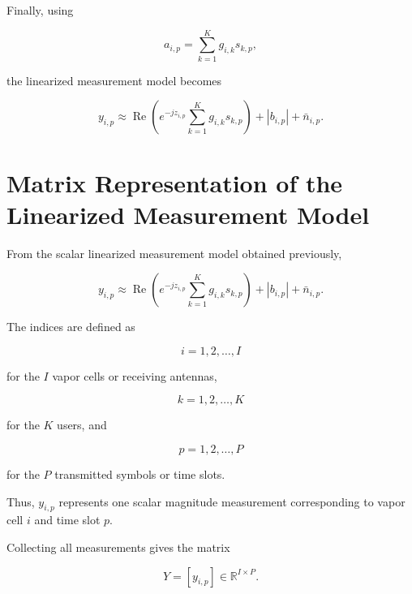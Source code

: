 \documentclass[12pt,a4paper]{article}
\begin{document}
Finally, using

\begin{equation}
a_{i,p}
=
\sum_{k=1}^{K}
g_{i,k}s_{k,p},
\tag{133}
\end{equation}

the linearized measurement model becomes

\begin{equation}
\boxed{
y_{i,p}
\approx
\operatorname{Re}
\left(
e^{-jz_{i,p}}
\sum_{k=1}^{K}
g_{i,k}s_{k,p}
\right)
+
|b_{i,p}|
+
\bar n_{i,p}
}.
\tag{134}
\end{equation}



\section{Matrix Representation of the Linearized Measurement Model}

From the scalar linearized measurement model obtained previously,

\begin{equation}
y_{i,p}
\approx
\operatorname{Re}
\left(
e^{-jz_{i,p}}
\sum_{k=1}^{K}
g_{i,k}s_{k,p}
\right)
+
|b_{i,p}|
+
\bar n_{i,p}.
\tag{135}
\end{equation}

The indices are defined as

\[
i=1,2,\ldots,I
\]

for the $I$ vapor cells or receiving antennas,

\[
k=1,2,\ldots,K
\]

for the $K$ users, and

\[
p=1,2,\ldots,P
\]

for the $P$ transmitted symbols or time slots.

Thus, $y_{i,p}$ represents one scalar magnitude measurement corresponding to vapor cell $i$ and time slot $p$.

Collecting all measurements gives the matrix

\begin{equation}
\boxed{
Y=[y_{i,p}]
\in
\mathbb{R}^{I\times P}
}.
\tag{136}
\end{equation}
\end{document}
